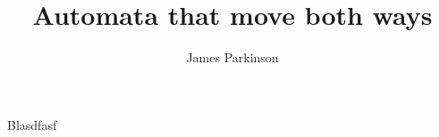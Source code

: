 \documentclass[12pt, a4paper]{article}
\title{Automata that move both ways}
\author{James Parkinson}
\begin{document}
\maketitle
\pagebreak
Blasdfasf
\end{document}
